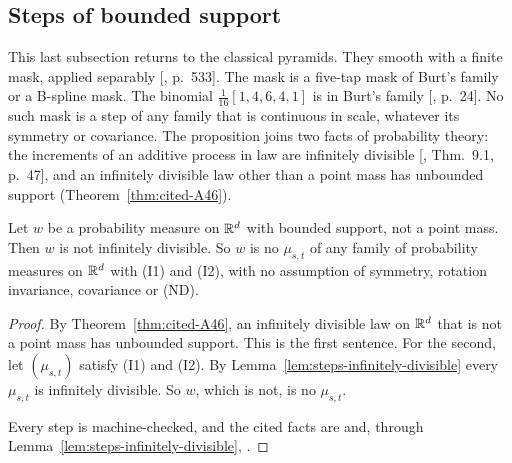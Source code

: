 \subsection{Steps of bounded support}
\label{sec:pyramid-bounded}

This last subsection returns to the classical pyramids. They smooth with a finite mask, applied
separably [, p.~533]. The mask is a five-tap mask of Burt's family or a
B-spline mask. The binomial $\tfrac1{16}[1,4,6,4,1]$ is in Burt's family
[, p.~24]. No such mask is a step of any family that is continuous in scale,
whatever its symmetry or covariance. The proposition joins two facts of probability theory: the
increments of an additive process in law are infinitely divisible [,
Thm.~9.1, p.~47], and an infinitely divisible law other than a point mass has unbounded support
(Theorem~\ref{thm:cited-A46}).

\begin{proposition}
\label{prop:no-bounded-step}

Let $w$ be a probability measure on $\mathbb{R}^d$ with bounded support, not a point mass. Then $w$ is not
infinitely divisible. So $w$ is no $\mu_{s,t}$ of any family of probability measures on $\mathbb{R}^d$ with
(I1) and (I2), with no assumption of symmetry, rotation invariance, covariance or (ND).
\end{proposition}

\begin{proof}
By Theorem~\ref{thm:cited-A46}, an infinitely divisible law on $\mathbb{R}^d$ that is not a point mass
has unbounded support. This is the first sentence. For the second, let $(\mu_{s,t})$ satisfy (I1)
and (I2). By Lemma~\ref{lem:steps-infinitely-divisible} every $\mu_{s,t}$ is infinitely
divisible. So $w$, which is not, is no $\mu_{s,t}$.

Every step is machine-checked, and the cited facts are  and, through
Lemma~\ref{lem:steps-infinitely-divisible}, .
\end{proof}

